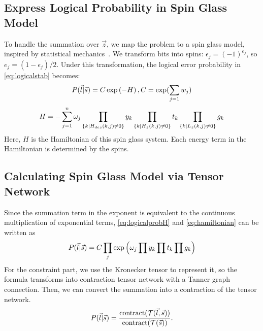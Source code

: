 \subsection{Express Logical Probability in Spin Glass Model}\label{subsec:proofB}

To handle the summation over \( \vec{z} \), we map the problem to a spin glass model, inspired by statistical mechanics~\cite{cao2025exact,sourlas1989spin}. We transform bits into spins: \( \epsilon_j = (-1)^{e_j} \), so \( e_j = (1 - \epsilon_j)/2 \). Under this transformation, the logical error probability in \autoref{eq:logicalstab} becomes:
\begin{equation} \small \label{eq:logicalprobH}
    P(\vec{l}|\vec{s}) = C\exp \left( - H \right), C = \exp(\sum_{j=1} w_j)
\end{equation}
\begin{equation} \small\label{eq:hamiltonian}
    {\tiny  H }= { \tiny -\sum_{j=1}^n \omega_j\prod_{\{k|H_{des}(k,j)\neq 0\}} y_k \prod_{\{k|H_{z}(k,j)\neq 0\}} t_k \prod_{\{k|L_z(k,j)\neq 0\}} g_k }
\end{equation}
Here, $H$ is the Hamiltonian of this spin glass system. Each energy term in the Hamiltonian is determined by the spins. 

\subsection{Calculating Spin Glass Model via Tensor Network}\label{subsec:proofC}
Since the summation term in the exponent is equivalent to the continuous multiplication of exponential terms, \eqref{eq:logicalprobH} and \eqref{eq:hamiltonian} can be written as
\begin{equation}\small
    P(\vec{l}|\vec{s}) = C\prod_j \exp \left (\omega_j \prod y_k \prod t_k \prod g_k \right )
\end{equation}
For the constraint part, we use the Kronecker tensor to represent it, so the formula transforms into contraction tensor network with a Tanner graph connection. Then, we can convert the summation into a contraction of the tensor network. 
\begin{equation} \small
    P(\vec{l}|\vec{s}) = \frac{{\text{contract}}(\mathcal{T}(\vec{l},\vec{s}))}{\text{contract}(\mathcal{T}(\vec{s}))}. 
\end{equation}
